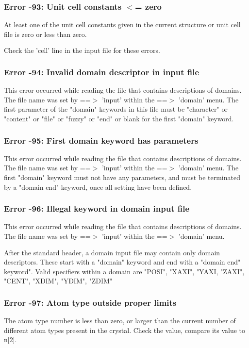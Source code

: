 \subsubsection{Error -93: Unit cell constants $ <$= zero}
\par
At least one of the unit cell constants given in the current 
structure or unit cell file is zero or less than zero. 
\par
Check the 'cell' line in the input file for these errors. 
\subsubsection{Error -94: Invalid domain descriptor in input file}
\par
This error occurred while reading the file that contains descriptions 
of domains. The file name was set by ==$> $ 'input' within the 
==$> $ 'domain' menu. 
The first parameter of the "domain" keywords in this file must be 
"character" or "content" or "file" or "fuzzy" or "end" or blank 
for the first "domain" keyword. 
\subsubsection{Error -95: First domain keyword has parameters}
\par
This error occurred while reading the file that contains descriptions 
of domains. The file name was set by ==$> $ 'input' within the 
==$> $ 'domain' menu. 
The first "domain" keyword must not have any parameters, and must 
be terminated by a "domain end" keyword, once all setting have been 
defined. 
\subsubsection{Error -96: Illegal keyword in domain input file}
\par
This error occurred while reading the file that contains descriptions 
of domains. The file name was set by ==$> $ 'input' within the 
==$> $ 'domain' menu. 
\par
After the standard header, a domain input file may contain only 
domain descriptors. These start with a "domain" keyword and end 
with a "domain end" keyword". Valid specifiers within a domain are 
"POSI", "XAXI", "YAXI, "ZAXI", "CENT", "XDIM", "YDIM", "ZDIM" 
\subsubsection{Error -97: Atom type outside proper limits}
\par
The atom type number is less than zero, or larger than the current 
number of different atom types present in the crystal. 
Check the value, compare its value to n[2]. 
